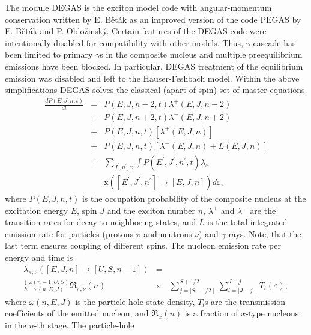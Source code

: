 \documentclass[twocolumn,amsmath,amssymb,10pt,groupedaddress,a4paper]{revtex4}
\begin{document}
The module DEGAS is the exciton model
code with angular-momentum conservation written by E. B\v et\' ak
as an improved version of the code PEGAS \cite{Degas} by E. B\v et\' ak
and P. Oblo\v zinsk\' y.  Certain features of the DEGAS code
were intentionally disabled for compatibility with other models.
Thus, $\gamma$-cascade has been limited to primary
$\gamma$s in the composite nucleus and multiple preequilibrium emissions
have been blocked. In particular, DEGAS treatment of the equilibrium
emission was disabled and left to the Hauser-Feshbach
model.
Within the above simplifications DEGAS solves the classical
(apart of spin) set of master equations
\begin{eqnarray}
\frac{dP(E,J,n,t)}{dt} & = & P(E,J,n-2,t)\lambda^{+}(E,J,n-2)\nonumber \\
 & + & P(E,J,n+2,t)\lambda^{-}(E,J,n+2)\nonumber \\
 & + & P(E,J,n,t)\left[\lambda^{+}(E,J,n)\right]\nonumber\\
 & + & P(E,J,n,t)\left[\lambda^{-}(E,J,n)+L(E,J,n)\right]\label{mastereq}\nonumber\\
 & + & \sum_{J^{'},n^{'},x}\int P(E^{'},J^{'},n^{'},t)\lambda_{x}\nonumber\\
 &&\text{x} \left(\left[E^{'},J^{'},n^{'}\right]\rightarrow\left[E,J,n\right]\right)d\varepsilon,
\end{eqnarray}
\noindent where $P(E,J,n,t)$ is the occupation probability of the composite
nucleus at the excitation energy $E$, spin $J$ and the exciton number
$n$, $\lambda^{+}$ and $\lambda^{-}$ are the transition rates for
decay to neighboring states, and $L$ is the total integrated emission
rate for particles (protons $\pi$ and neutrons $\nu$) and $\gamma$-rays.
Note, that the last term ensures coupling of different spins. The
nucleon emission rate per energy and time is
\begin{eqnarray}
\lambda_{\pi,\nu}\left(\left[E,J,n\right]\rightarrow\left[U,S,n-1\right]\right)&=&\\
\frac{1}{h}\frac{\omega(n-1,U,S)}{\omega(n,E,J)}\Re_{\pi,\nu}(n)&\text{x}& \sum_{j=\mid S-1/2\mid}^{S+1/2}\sum_{l=\mid J-j\mid}^{J-j}T_{l}(\varepsilon),\nonumber
\end{eqnarray}
\noindent where $\omega(n,E,J)$ is the particle-hole state density, $T_{l}$s
are the transmission coefficients of the emitted nucleon, and $\Re_{x}(n)$
is a fraction of $x$-type nucleons in the $n$-th stage. The particle-hole
\end{document}
